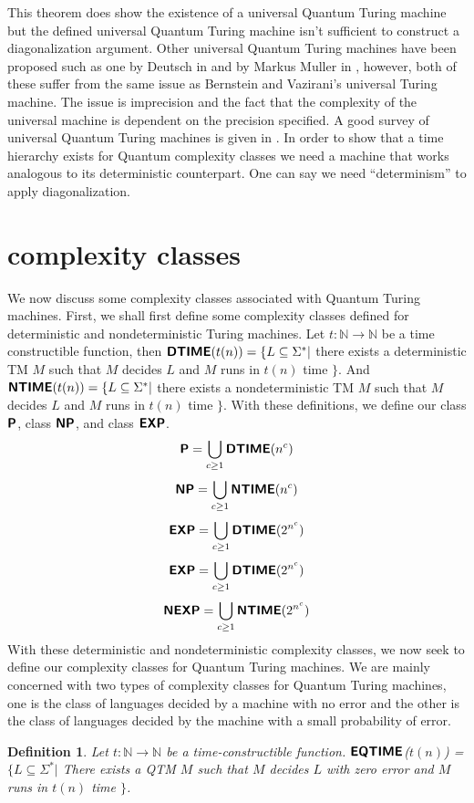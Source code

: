 \documentclass[11pt,a4paper]{article}
\newtheorem{definition}{Definition}
\newcommand{\classX}[1]{\ensuremath{\text{\textsf{\textbf{#1}}}}}
\newcommand{\classP}{\classX{P}}
\newcommand{\classNP}{\classX{NP}}
\newcommand{\EXP}{\classX{EXP}}
\newcommand{\NEXP}{\classX{NEXP}}
\newcommand{\EQ}{\classX{EQTIME}}
\newcommand{\D}{\classX{DTIME}}
\newcommand{\N}{\classX{NTIME}}
\begin{document}
    This theorem does show the existence of a universal Quantum Turing machine but the defined universal Quantum Turing machine isn't sufficient to construct a diagonalization argument.
    Other universal Quantum Turing machines have been proposed such as one by Deutsch in \cite{9} and by Markus Muller in \cite{12}, however, both of these suffer from the same issue as Bernstein and Vazirani's universal Turing machine. 
    The issue is imprecision and the fact that the complexity of the universal machine is dependent on the precision specified. A good survey of universal Quantum Turing machines is given in \cite{2}.
    In order to show that a time hierarchy exists for Quantum complexity classes we need a machine that works analogous to its deterministic counterpart. One can say we need ``determinism'' to apply diagonalization.
\section{complexity classes}
    We now discuss some complexity classes associated with Quantum Turing machines.
    First, we shall first define some complexity classes defined for deterministic and nondeterministic Turing machines.
    Let $t:\mathbb{N} \to \mathbb{N}$ be a time constructible function, then $\D(t(n)) = \{L \subseteq \Sigma^*|$ there exists a deterministic TM $M$ such that $M$ decides $L$ and $M$ runs in $t(n)$ time $\}$. 
    And $\N(t(n)) = \{L \subseteq \Sigma^*|$ there exists a nondeterministic TM $M$ such that $M$ decides $L$ and $M$ runs in $t(n)$ time $\}$.
    With these definitions, we define our class $\classP$, class \classNP, and class \EXP.
    $$\classP = \bigcup_{c\geq 1}\D(n^c)$$
    $$\classNP = \bigcup_{c\geq 1}\N(n^c)$$
    $$\EXP = \bigcup_{c\geq 1}\D(2^{n^c})$$
    $$\EXP = \bigcup_{c\geq 1}\D(2^{n^c})$$
    $$\NEXP = \bigcup_{c\geq 1}\N(2^{n^c})$$
    With these deterministic and nondeterministic complexity classes, we now seek to define our complexity classes for Quantum Turing machines.
    We are mainly concerned with two types of complexity classes for Quantum Turing machines, one is the class of languages decided by a machine with no error and the other is the class of languages decided by the machine with a small probability of error.
    \begin{definition}
        Let $t: \mathbb{N} \to \mathbb{N}$ be a time-constructible function. \EQ($t(n)$) = $\{L \subseteq \Sigma^*|$ There exists a QTM $M$ such that $M$ decides $L$ with zero error and $M$ runs in $t(n)$ time $\}$.
    \end{definition}
\end{document}
